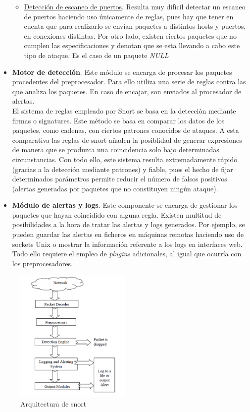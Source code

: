\begin{itemize}
\begin{itemize}
	\item \underline{Detección de escaneo de puertos}. Resulta muy difícil detectar un escaneo de puertos haciendo uso únicamente de reglas, pues hay que tener en cuenta que para realizarlo se envían paquetes a distintos hosts y puertos, en conexiones distintas. Por otro lado, existen ciertos paquetes que no cumplen las especificaciones y denotan que se esta llevando a cabo este tipo de ataque. Es el caso de un paquete \textit{NULL}
\end{itemize}
	\item \textbf{Motor de detección}. Este módulo se encarga de procesar los paquetes procedentes del preprocesador. Para ello utiliza una serie de reglas contra las que analiza los paquetes. En caso de encajar, son enviados al procesador de alertas.\\
El sistema de reglas empleado por Snort se basa en la detección mediante firmas o signatures. Este método se basa en comparar los datos de los paquetes, como cadenas, con ciertos patrones conocidos de ataques. A esta comparativa las reglas de snort añaden la posiblidad de generar expresiones de manera que se produzca una coincidencia solo bajo determinadas circunstancias. Con todo ello, este sistema resulta extremadamente rápido (gracias a la detección mediante patrones) y fiable, pues el hecho de fijar determinados parámetros permite reducir el número de falsos positivos (alertas generadas por paquetes que no constituyen ningún ataque).

	\item \textbf{Módulo de alertas y logs}. Este componente se encarga de gestionar los paquetes que hayan coincidido con alguna regla. Existen multitud de posibilidades a la hora de tratar las alertas y logs generados. Por ejemplo, se pueden guardar las alertas en ficheros en máquinas remotas haciendo uso de sockets Unix o mostrar la información referente a los logs en interfaces web. Todo ello requiere el empleo de \textit{plugins} adicionales, al igual que ocurría con los preprocesadores.
\end{itemize}
\begin{figure}[t]
\centering
\includegraphics[width=0.5\textwidth]{images/snortArch.png}
\caption{Arquitectura de snort}
\label{fig:snortArch}
\end{figure}

